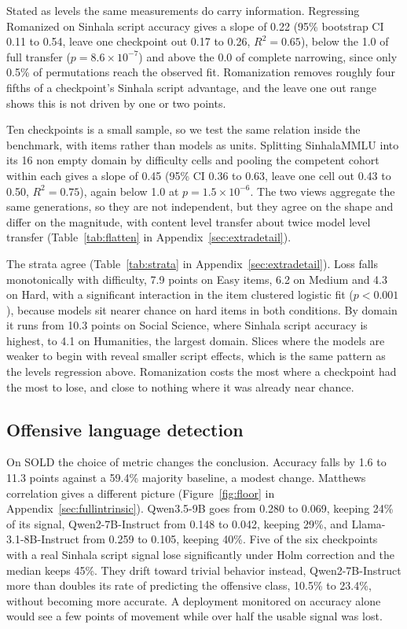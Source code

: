 \documentclass[11pt]{article}
\begin{document}
Stated as levels the same measurements do carry information. Regressing Romanized on
Sinhala script accuracy gives a slope of 0.22 (95\% bootstrap CI 0.11 to 0.54,
leave one checkpoint out 0.17 to 0.26, $R^2 = 0.65$), below the 1.0 of full transfer
($p = 8.6 \times 10^{-7}$) and above the 0.0 of complete narrowing, since only 0.5\% of
permutations reach the observed fit. Romanization removes roughly four fifths of a
checkpoint's Sinhala script advantage, and the leave one out range shows this is not
driven by one or two points.

Ten checkpoints is a small sample, so we test the same relation inside the benchmark,
with items rather than models as units. Splitting SinhalaMMLU into its 16 non empty domain
by difficulty cells and pooling the competent cohort within each gives a slope of 0.45
(95\% CI 0.36 to 0.63, leave one cell out 0.43 to 0.50, $R^2 = 0.75$), again below 1.0 at
$p = 1.5 \times 10^{-6}$. The two views aggregate the same generations, so they are not
independent, but they agree on the shape and differ on the magnitude, with content level
transfer about twice model level transfer (Table~\ref{tab:flatten} in
Appendix~\ref{sec:extradetail}).

The strata agree (Table~\ref{tab:strata} in Appendix~\ref{sec:extradetail}). Loss falls monotonically with
difficulty, 7.9 points on Easy items, 6.2 on Medium and 4.3 on Hard, with a significant
interaction in the item clustered logistic fit ($p < 0.001$), because models sit nearer
chance on hard items in both conditions. By domain it runs from 10.3 points on Social
Science, where Sinhala script accuracy is highest, to 4.1 on Humanities, the largest
domain. Slices where the models are weaker to begin with reveal smaller script effects,
which is the same pattern as the levels regression above. Romanization costs the most
where a checkpoint had the most to lose, and close to nothing where it was already near
chance.

\subsection{Offensive language detection}

On SOLD the choice of metric changes the conclusion. Accuracy falls by 1.6 to 11.3
points against a 59.4\% majority baseline, a modest change. Matthews correlation gives a
different picture (Figure~\ref{fig:floor} in Appendix~\ref{sec:fullintrinsic}). Qwen3.5-9B goes from 0.280 to 0.069,
keeping 24\% of its signal, Qwen2-7B-Instruct from 0.148 to 0.042, keeping 29\%, and
Llama-3.1-8B-Instruct from 0.259 to 0.105, keeping 40\%. Five of the six checkpoints with
a real Sinhala script signal lose significantly under Holm correction and the median keeps
45\%. They drift toward trivial behavior instead, Qwen2-7B-Instruct more than doubles its
rate of predicting the offensive class, 10.5\% to 23.4\%, without becoming more accurate.
A deployment monitored on accuracy alone would see a few points of movement while over
half the usable signal was lost.
\end{document}
